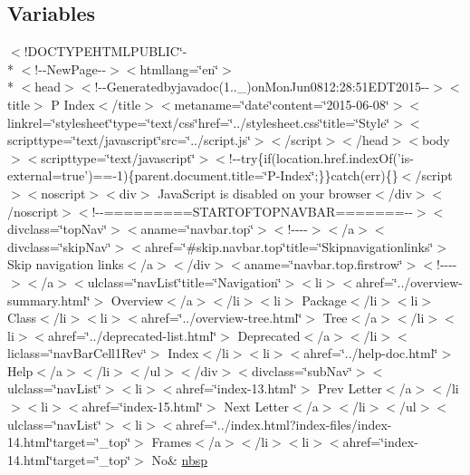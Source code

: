 \subsection*{Variables}
\begin{DoxyCompactItemize}
\item 
$<$!D\-O\-C\-T\-Y\-P\-E\-H\-T\-M\-L\-P\-U\-B\-L\-I\-C\char`\"{}-\/\\*
$<$!-\/-\/New\-Page-\/-\/$>$$<$htmllang=\char`\"{}en\char`\"{}$>$\\*
$<$head$>$$<$!-\/-\/Generatedbyjavadoc(1..\-\_)on\-Mon\-Jun0812\-:28\-:51\-E\-D\-T2015-\/-\/$>$$<$title$>$ P Index$<$/title$>$$<$metaname=\char`\"{}date\char`\"{}content=\char`\"{}2015-\/06-\/08\char`\"{}$>$$<$linkrel=\char`\"{}stylesheet\char`\"{}type=\char`\"{}text/css\char`\"{}href=\char`\"{}../stylesheet.\-css\char`\"{}title=\char`\"{}\-Style\char`\"{}$>$$<$scripttype=\char`\"{}text/javascript\char`\"{}src=\char`\"{}../script.\-js\char`\"{}$>$$<$/script$>$$<$/head$>$$<$body$>$$<$scripttype=\char`\"{}text/javascript\char`\"{}$>$$<$!-\/-\/try\{if(location.\-href.\-index\-Of('is-\/external=true')==-\/1)\{parent.\-document.\-title=\char`\"{}\-P-\/\-Index\char`\"{};\}\}catch(err)\{\}$<$/script$>$$<$noscript$>$$<$div$>$ Java\-Script is disabled on your browser$<$/div$>$$<$/noscript$>$$<$!-\/-\/=========\-S\-T\-A\-R\-T\-O\-F\-T\-O\-P\-N\-A\-V\-B\-A\-R=======-\/-\/$>$$<$divclass=\char`\"{}top\-Nav\char`\"{}$>$$<$aname=\char`\"{}navbar.\-top\char`\"{}$>$$<$!-\/-\/-\/-\/$>$$<$/a$>$$<$divclass=\char`\"{}skip\-Nav\char`\"{}$>$$<$ahref=\char`\"{}\#skip.\-navbar.\-top\char`\"{}title=\char`\"{}\-Skipnavigationlinks\char`\"{}$>$ Skip navigation links$<$/a$>$$<$/div$>$$<$aname=\char`\"{}navbar.\-top.\-firstrow\char`\"{}$>$$<$!-\/-\/-\/-\/$>$$<$/a$>$$<$ulclass=\char`\"{}nav\-List\char`\"{}title=\char`\"{}\-Navigation\char`\"{}$>$$<$li$>$$<$ahref=\char`\"{}../overview-\/summary.\-html\char`\"{}$>$ Overview$<$/a$>$$<$/li$>$$<$li$>$ Package$<$/li$>$$<$li$>$ Class$<$/li$>$$<$li$>$$<$ahref=\char`\"{}../overview-\/tree.\-html\char`\"{}$>$ Tree$<$/a$>$$<$/li$>$$<$li$>$$<$ahref=\char`\"{}../deprecated-\/list.\-html\char`\"{}$>$ Deprecated$<$/a$>$$<$/li$>$$<$liclass=\char`\"{}nav\-Bar\-Cell1\-Rev\char`\"{}$>$ Index$<$/li$>$$<$li$>$$<$ahref=\char`\"{}../help-\/doc.\-html\char`\"{}$>$ Help$<$/a$>$$<$/li$>$$<$/ul$>$$<$/div$>$$<$divclass=\char`\"{}sub\-Nav\char`\"{}$>$$<$ulclass=\char`\"{}nav\-List\char`\"{}$>$$<$li$>$$<$ahref=\char`\"{}index-\/13.\-html\char`\"{}$>$ Prev Letter$<$/a$>$$<$/li$>$$<$li$>$$<$ahref=\char`\"{}index-\/15.\-html\char`\"{}$>$ Next Letter$<$/a$>$$<$/li$>$$<$/ul$>$$<$ulclass=\char`\"{}nav\-List\char`\"{}$>$$<$li$>$$<$ahref=\char`\"{}../index.\-html?index-\/files/index-\/14.\-html\char`\"{}target=\char`\"{}\-\_\-top\char`\"{}$>$ Frames$<$/a$>$$<$/li$>$$<$li$>$$<$ahref=\char`\"{}index-\/14.\-html\char`\"{}target=\char`\"{}\-\_\-top\char`\"{}$>$ No\& \hyperlink{index-14_8html_a479d00f21dbca369efe3be97f1ef785a}{nbsp}
\end{DoxyCompactItemize}


